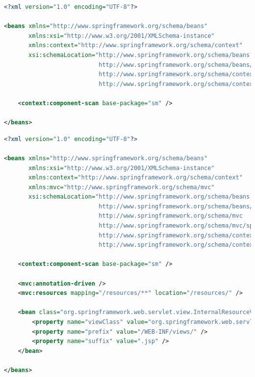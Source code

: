 \begin{lstlisting}[language=xml,title=src/main/resources/appconfig]
<?xml version="1.0" encoding="UTF-8"?>

<beans xmlns="http://www.springframework.org/schema/beans"
       xmlns:xsi="http://www.w3.org/2001/XMLSchema-instance"
       xmlns:context="http://www.springframework.org/schema/context"
       xsi:schemaLocation="http://www.springframework.org/schema/beans
                           http://www.springframework.org/schema/beans/spring-beans.xsd
                           http://www.springframework.org/schema/context
                           http://www.springframework.org/schema/context/spring-context.xsd ">

    <context:component-scan base-package="sm" />

</beans>
\end{lstlisting}

\begin{lstlisting}[language=xml,title=src/main/resources/webconfig]
<?xml version="1.0" encoding="UTF-8"?>

<beans xmlns="http://www.springframework.org/schema/beans"
       xmlns:xsi="http://www.w3.org/2001/XMLSchema-instance"
       xmlns:context="http://www.springframework.org/schema/context"
       xmlns:mvc="http://www.springframework.org/schema/mvc"
       xsi:schemaLocation="http://www.springframework.org/schema/beans
                           http://www.springframework.org/schema/beans/spring-beans.xsd
                           http://www.springframework.org/schema/mvc
                           http://www.springframework.org/schema/mvc/spring-mvc.xsd
                           http://www.springframework.org/schema/context
                           http://www.springframework.org/schema/context/spring-context.xsd ">

	<context:component-scan base-package="sm" />

	<mvc:annotation-driven />
	<mvc:resources mapping="/resources/**" location="/resources/" />

	<bean class="org.springframework.web.servlet.view.InternalResourceViewResolver">
		<property name="viewClass" value="org.springframework.web.servlet.view.JstlView" />
		<property name="prefix" value="/WEB-INF/views/" />
		<property name="suffix" value=".jsp" />
	</bean>
	
</beans>
\end{lstlisting}

